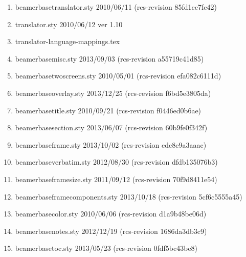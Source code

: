 \begin{enumerate}
\item 		 beamerbasetranslator.sty 2010/06/11 (rcs-revision 85fd1cc7fc42)
\item 		 translator.sty 2010/06/12 ver 1.10
\item 		 translator-language-mappings.tex
\item 		 beamerbasemisc.sty 2013/09/03 (rcs-revision a55719c41d85)
\item 		 beamerbasetwoscreens.sty 2010/05/01 (rcs-revision efa082c6111d)
\item 		 beamerbaseoverlay.sty 2013/12/25 (rcs-revision f6bd5e3805da)
\item beamerbasetitle.sty 2010/09/21 (rcs-revision f0446ed0b6ae)
\item 		 beamerbasesection.sty 2013/06/07 (rcs-revision 60b9fe0f342f)
\item 		 beamerbaseframe.sty 2013/10/02 (rcs-revision cdc8e9a3aaac)
\item 		 beamerbaseverbatim.sty 2012/08/30 (rcs-revision dfdb135076b3)
\item 		 beamerbaseframesize.sty 2011/09/12 (rcs-revision 70f9d8411e54)
\item 		 beamerbaseframecomponents.sty 2013/10/18 (rcs-revision 5cf6c5555a45)
\item 		 beamerbasecolor.sty 2010/06/06 (rcs-revision d1a9b48be06d)
\item 		 beamerbasenotes.sty 2012/12/19 (rcs-revision 1686da3db3c9)
\item 		 beamerbasetoc.sty 2013/05/23 (rcs-revision 0fdf5bc43be8)

\end{enumerate}

